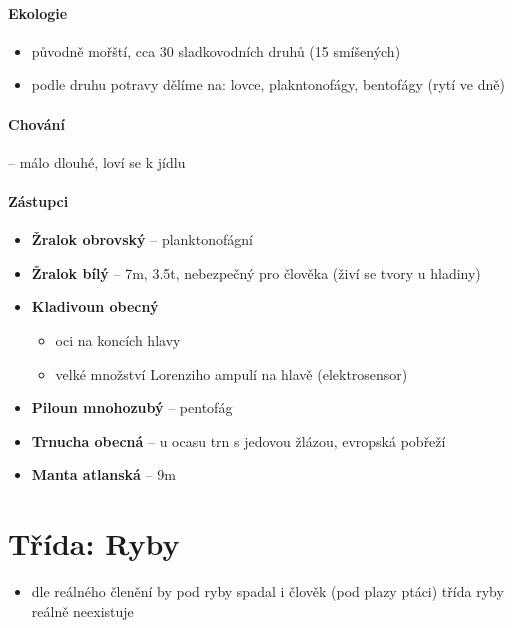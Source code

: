 \paragraph{Ekologie}
\begin{itemize}
\item původně mořští, cca 30 sladkovodních druhů (15 smíšených)
\item podle druhu potravy dělíme na: lovce, plakntonofágy, bentofágy (rytí ve dně)
\end{itemize}

\paragraph{Chování} -- málo dlouhé, loví se k jídlu

\paragraph{Zástupci}
\begin{itemize}
\item \textbf{Žralok obrovský} -- planktonofágní
\item \textbf{Žralok bílý} -- 7m, 3.5t, nebezpečný pro člověka (živí se tvory u hladiny)
\item \textbf{Kladivoun obecný}
	\begin{itemize}
	\item oci na koncích hlavy
	\item velké množství Lorenziho ampulí na hlavě (elektrosensor)
	\end{itemize}
\item \textbf{Piloun mnohozubý} -- pentofág
\item \textbf{Trnucha obecná} -- u ocasu trn s jedovou žlázou, evropská pobřeží
\item \textbf{Manta atlanská} -- 9m 
\end{itemize}

\newpage
\section{Třída: Ryby}
\begin{itemize}
\item dle reálného členění by pod ryby spadal i člověk (pod plazy ptáci) \ra třída ryby reálně neexistuje

\end{itemize}


